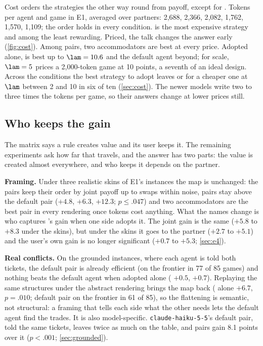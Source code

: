 Cost orders the strategies the other way round from payoff, except for \collaborating. Tokens per agent and game in E1, averaged over partners: \competing{} 2{,}688, \collaborating{} 2{,}366, \neutral{} 2{,}082, \compromising{} 1{,}762, \accommodating{} 1{,}570, \avoiding{} 1{,}109; the order holds in every condition. \competing{} is the most expensive strategy and among the least rewarding. Priced, the talk changes the answer early (\cref{fig:cost}). Among pairs, two accommodators are best at every price. Adopted alone, \collaborating{} is best up to $\lam = 10.6$ and the default agent beyond; for scale, $\lam = 5$ prices a 2{,}000-token game at 10 points, a seventh of an ideal design. Across the conditions the best strategy to adopt leaves \collaborating{} or \competing{} for a cheaper one at $\lam$ between 2 and 10 in six of ten (\cref{sec:cost}). The newer models write two to three times the tokens per game, so their answers change at lower prices still.

\subsection{Who keeps the gain}
\label{sec:r-transfer}
The matrix says a \collaborating{} rule creates value and its user keeps it. The remaining experiments ask how far that travels, and the answer has two parts: the value is created almost everywhere, and who keeps it depends on the partner.

\textbf{Framing.} Under three realistic skins of E1's instances the map is unchanged: the pairs keep their order by joint payoff up to swaps within noise, \collaborating{} pairs stay above the default pair ($+4.8$, $+6.3$, $+12.3$; $p \le .047$) and two accommodators are the best pair in every rendering once tokens cost anything. What the names change is who captures \collaborating's gain when one side adopts it. The joint gain is the same ($+5.8$ to $+8.3$ under the skins), but under the skins it goes to the partner ($+2.7$ to $+5.1$) and the user's own gain is no longer significant ($+0.7$ to $+5.3$; \cref{sec:e4}).

\textbf{Real conflicts.} On the grounded instances, where each agent is told both tickets, the default pair is already efficient (on the frontier in 77 of 85 games) and nothing beats the default agent when adopted alone (\collaborating{} $+0.5$, \competing{} $+0.7$). Replaying the same structures under the abstract rendering brings the map back (\collaborating{} alone $+6.7$, $p = .010$; default pair on the frontier in 61 of 85), so the flattening is semantic, not structural: a framing that tells each side what the other needs lets the default agent find the trades. It is also model-specific. \texttt{claude-haiku-5-5}'s default pair, told the same tickets, leaves twice as much on the table, and \collaborating{} pairs gain 8.1 points over it ($p < .001$; \cref{sec:grounded}).

